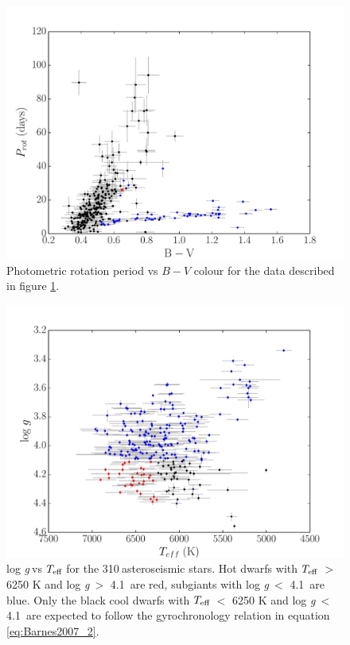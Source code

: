 \documentclass[11pt,preprint]{aastex}
\newcommand{\logg}{log \emph{g}}
\newcommand{\teff}{$T_{\rm{eff}}$}
\newcommand{\nastero}{310}
\newcommand{\subcut}{4.1~}
\begin{document}
\begin{figure}[ht]
\begin{center}
\includegraphics[width=6in, clip=true, trim=0 0 0.5in 0]{p_vs_bv_paper2.pdf}
\caption{Photometric rotation period vs $B-V$ colour for the data described in
	figure \ref{fig:3d}.
\label{fig:3d}}
\end{center}
\end{figure}

\begin{figure}[ht]
\begin{center}
\includegraphics[width=6in, clip=true, trim=0 0 0.5in 0]{logg_vs_t_paper.pdf}
\caption{\logg$~$vs \teff$~$for the \nastero$~$asteroseismic stars. Hot dwarfs
with \teff$~>$ 6250 K and \logg$~>$ \subcut are red, subgiants with \logg$~<$
\subcut are blue. Only the black cool dwarfs with \teff$~<$ 6250 K and
\logg$~<$ \subcut are expected to follow the gyrochronology relation in
equation \ref{eq:Barnes2007_2}.
\label{fig:logg_vs_t}}
\end{center}
\end{figure}
\end{document}
